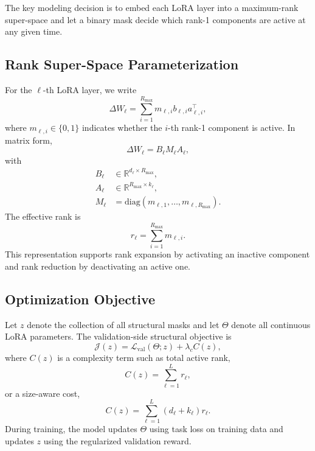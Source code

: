 \documentclass{article}
\newcommand{\Rmax}{R_{\max}}
\begin{document}
The key modeling decision is to embed each LoRA layer into a maximum-rank super-space and let a binary mask decide which rank-1 components are active at any given time.

\subsection{Rank Super-Space Parameterization}
For the $\ell$-th LoRA layer, we write
\begin{equation}
    \Delta W_\ell = \sum_{i=1}^{\Rmax} m_{\ell,i} b_{\ell,i} a_{\ell,i}^{\top},
\end{equation}
where $m_{\ell,i} \in \{0,1\}$ indicates whether the $i$-th rank-1 component is active. In matrix form,
\begin{equation}
    \Delta W_\ell = B_\ell M_\ell A_\ell,
\end{equation}
with
\begin{equation}
\begin{aligned}
    B_\ell &\in \mathbb{R}^{d_\ell \times \Rmax}, \\
    A_\ell &\in \mathbb{R}^{\Rmax \times k_\ell}, \\
    M_\ell &= \mathrm{diag}(m_{\ell,1}, \dots, m_{\ell,\Rmax}).
\end{aligned}
\end{equation}
The effective rank is
\begin{equation}
    r_\ell = \sum_{i=1}^{\Rmax} m_{\ell,i}.
\end{equation}
This representation supports rank expansion by activating an inactive component and rank reduction by deactivating an active one.

\subsection{Optimization Objective}
Let $z$ denote the collection of all structural masks and let $\Theta$ denote all continuous LoRA parameters. The validation-side structural objective is
\begin{equation}
    \mathcal{J}(z) = \mathcal{L}_{\mathrm{val}}(\Theta; z) + \lambda_c C(z),
\end{equation}
where $C(z)$ is a complexity term such as total active rank,
\begin{equation}
    C(z) = \sum_{\ell=1}^{L} r_\ell,
\end{equation}
or a size-aware cost,
\begin{equation}
    C(z) = \sum_{\ell=1}^{L}(d_\ell + k_\ell)r_\ell.
\end{equation}
During training, the model updates $\Theta$ using task loss on training data and updates $z$ using the regularized validation reward.
\end{document}
